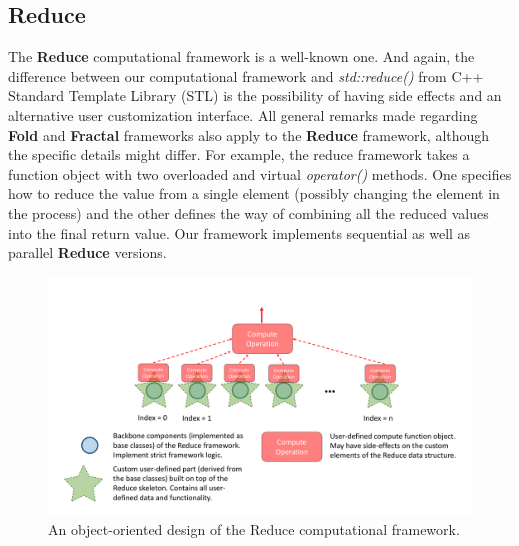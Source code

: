 \subsection{Reduce}
\label{frameworks_reduce}
\quad The \textbf{Reduce} computational framework is a well-known one. And again, the difference between our computational framework and \textit{std::reduce()} from C++ Standard Template Library (STL) is the possibility of having side effects and an alternative user customization interface. All general remarks made regarding \textbf{Fold} and \textbf{Fractal} frameworks also apply to the \textbf{Reduce} framework, although the specific details might differ. For example, the reduce framework takes a function object with two overloaded and virtual \textit{operator()} methods. One specifies how to reduce the value from a single element (possibly changing the element in the process) and the other defines the way of combining all the reduced values into the final return value. Our framework implements sequential as well as parallel \textbf{Reduce} versions.  
\begin{figure}[ht]
\includegraphics[width=1.0\textwidth]{images/Reduction.pdf}
\caption{An object-oriented design of the Reduce computational framework.}
\label{fig:reduce}
\end{figure}
